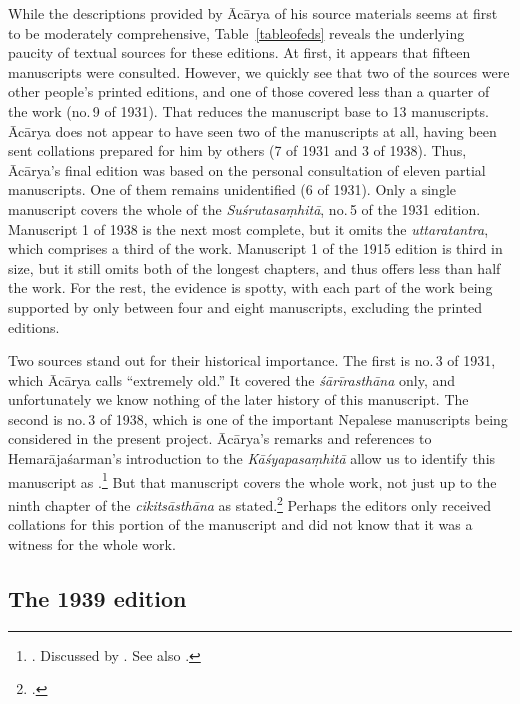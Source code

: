 While the descriptions provided by Ācārya of his source materials seems at first
to be moderately comprehensive, Table~\ref{tableofeds} reveals the underlying
paucity of textual sources for these editions.  At first, it appears that fifteen
manuscripts were consulted.  However, we quickly see that two of the sources 
were
other people's printed editions, and one of those covered less than a quarter of
the work (no.\,9 of 1931).  That reduces the manuscript base to 13 manuscripts.
Ācārya does not appear to have seen two of the manuscripts at all, having been
sent collations prepared for him by others (7 of 1931 and 3 of 1938).  Thus,
Ācārya's final edition was based on the personal consultation of eleven partial
manuscripts.   One of them remains unidentified (6 of 1931). Only a single
manuscript covers the whole of the \emph{Suśrutasaṃhitā}, no.\,5 of the 1931
edition.  Manuscript 1 of 1938 is the next most complete, but it omits the
\emph{uttaratantra}, which comprises a third of the work.  Manuscript 1 of the
1915 edition is third in size, but it still omits both of the longest chapters,
and thus offers less than half the work.  For the rest, the evidence is spotty,
with each part of the work being supported by only between four and eight
manuscripts, excluding the printed editions.

Two sources stand out for their historical importance.  The first is no.\,3 of
1931, which Ācārya calls “extremely old.”  It covered the \emph{śārīrasthāna}
only, and unfortunately we know nothing of the later history of this manuscript.
The second is no.\,3 of 1938, which is one of the important Nepalese manuscripts
being considered in the present project. Ācārya's remarks and references to
Hemarājaśarman's introduction to the \emph{Kāśyapasaṃhitā} allow us
to identify this manuscript as .\footnote{\cites[22]{vulgate}[56--57]{hema-1938}. Discussed by
\citet[\S 1.1, 2.3]{kleb-2021b}.  See also \cites[IIB, 
25--41]{meul-hist}[161--169]{wuja-2003}.} But 
that manuscript covers the whole work, not
just up to the ninth chapter of the \emph{cikitsāsthāna} as
\citeauthor{vulgate} stated.\footcite[22]{vulgate}  Perhaps the editors
only received collations for this portion of the manuscript and did not know that it
was a witness for the whole work.

\subsection{The 1939 edition}        
\label{1939edition}

